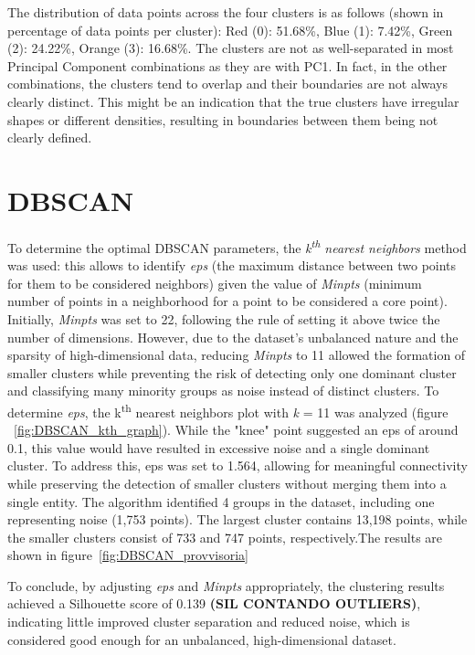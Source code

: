 The distribution of data points across the four clusters is as follows (shown in percentage of data points per cluster):
Red (0): 51.68\%, Blue (1): 7.42\%, Green (2): 24.22\%, Orange (3): 16.68\%.
The clusters are not as well-separated in most Principal Component combinations as they are with PC1. 
In fact, in the other combinations, the clusters tend to overlap and their boundaries are not always clearly distinct.
This might be an indication that the true clusters have irregular shapes or different densities, resulting in boundaries between them being not clearly defined.



\section{DBSCAN}\label{sec:density_based}
To determine the optimal DBSCAN parameters, the \textit{k\textsuperscript{th} nearest neighbors} method was used: this allows to identify \textit{eps} (the maximum distance between two points for them to be considered neighbors) given the value of \textit{Minpts} (minimum number of points in a neighborhood for a point to be considered a core point).
Initially, \textit{Minpts} was set to 22, following the rule of setting it above twice the number of dimensions. 
However, due to the dataset's unbalanced nature and the sparsity of high-dimensional data, reducing \textit{Minpts} to 11 allowed the formation of smaller clusters while preventing the risk of detecting only one dominant cluster and classifying many minority groups as noise instead of distinct clusters.
To determine \textit{eps}, the k\textsuperscript{th} nearest neighbors plot with \textit{k} = 11 was analyzed (figure ~\ref{fig:DBSCAN_kth_graph}). While the "knee" point suggested an eps of around 0.1, this value would have resulted in excessive noise and a single dominant cluster. 
To address this, eps was set to 1.564, allowing for meaningful connectivity while preserving the detection of smaller clusters without merging them into a single entity. 
The algorithm identified 4 groups in the dataset, including one representing noise (1,753 points). 
The largest cluster contains 13,198 points, while the smaller clusters consist of 733 and 747 points, 
respectively.The  results are shown in figure~\ref{fig:DBSCAN_provvisoria}

To conclude, by adjusting \textit{eps} and \textit{Minpts} appropriately, the clustering results achieved a Silhouette score of 0.139 \textbf{(SIL CONTANDO OUTLIERS)}, indicating little improved cluster separation and reduced noise, which is considered good enough for an unbalanced, high-dimensional dataset.

